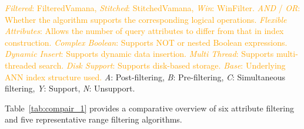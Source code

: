 \documentclass[sigconf, nonacm]{acmart}
\begin{document}
{\begin{table}[t]
		
		\centering
		\footnotesize{
			\begin{minipage}{\linewidth}
				\vspace{0.1cm}
		\textcolor{orange}{
		\textit{Filtered}: FilteredVamana, \textit{Stitched}: StitchedVamana, \textit{Win}: WinFilter.
		\textit{AND} / \textit{OR}: Whether the algorithm supports the corresponding logical operations.
		\textit{Flexible Attributes}: Allows the number of query attributes to differ from that in index construction.
		\textit{Complex Boolean}: Supports NOT or nested Boolean expressions.
		\textit{Dynamic Insert}: Supports dynamic data insertion.
		\textit{Multi Thread}: Supports multi-threaded search.
		\textit{Disk Support}: Supports disk-based storage.
		\textit{Base}: Underlying ANN index structure used.}
		\textit{A}: Post-filtering, 
		\textit{B}: Pre-filtering, 
		\textit{C}: Simultaneous filtering, 
		\textit{Y}: Support, 
		\textit{N}: Unsupport. 
		\end{minipage}}
		
	\end{table}
	
	
	Table~\ref{tab:compair_1} provides a comparative overview of six attribute filtering and five representative range filtering algorithms. 
	
}
\end{document}
